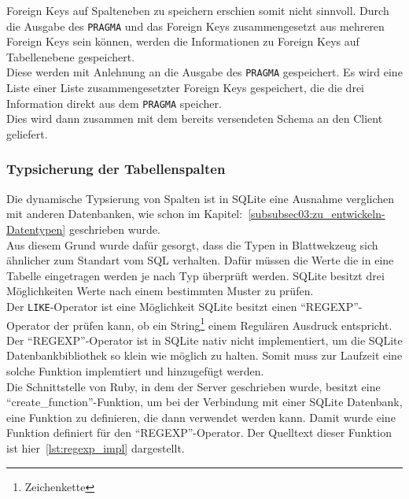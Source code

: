 Foreign Keys auf Spalteneben zu speichern erschien somit nicht sinnvoll. Durch die Ausgabe des \texttt{PRAGMA} und das Foreign Keys zusammengesetzt aus mehreren Foreign Keys sein können, werden die Informationen zu Foreign Keys auf Tabellenebene gespeichert. \\
Diese werden mit Anlehnung an die Ausgabe des \texttt{PRAGMA} gespeichert. Es wird eine Liste einer Liste zusammengesetzter Foreign Keys gespeichert, die die drei Information direkt aus dem \texttt{PRAGMA} speicher. \\
Dies wird dann zusammen mit dem bereits versendeten Schema an den Client geliefert.   

\subsubsection{Typsicherung der Tabellenspalten}
\label{subsubsec04:typsicherung}
Die dynamische Typsierung von Spalten ist in SQLite eine Ausnahme verglichen mit anderen Datenbanken, wie schon im Kapitel:~\ref{subsubsec03:zu_entwickeln-Datentypen} geschrieben wurde. \\
Aus diesem Grund wurde dafür gesorgt, dass die Typen in Blattwekzeug sich ähnlicher zum Standart vom SQL verhalten. Dafür müssen die Werte die in eine Tabelle eingetragen werden je nach Typ überprüft werden.
SQLite besitzt drei Möglichkeiten Werte nach einem bestimmten Muster zu prüfen. \\
Der \texttt{LIKE}-Operator ist eine Möglichkeit
%
 SQLite besitzt einen ``REGEXP''-Operator der prüfen kann, ob ein String\footnote{Zeichenkette} einem Regulären Ausdruck entspricht.
Der ``REGEXP''-Operator ist in SQLite nativ nicht implementiert, um die SQLite Datenbankbibliothek so klein wie möglich zu halten. Somit muss zur Laufzeit eine solche Funktion implemtiert und hinzugefügt werden. \\
Die Schnittstelle von Ruby, in dem der Server geschrieben wurde, besitzt eine ``create\_function''-Funktion, um bei der Verbindung mit einer SQLite Datenbank, eine Funktion zu definieren, die dann verwendet werden kann. Damit wurde eine Funktion definiert für den ``REGEXP''-Operator. Der Quelltext dieser Funktion ist hier~\ref{lst:regexp_impl} dargestellt.

 

